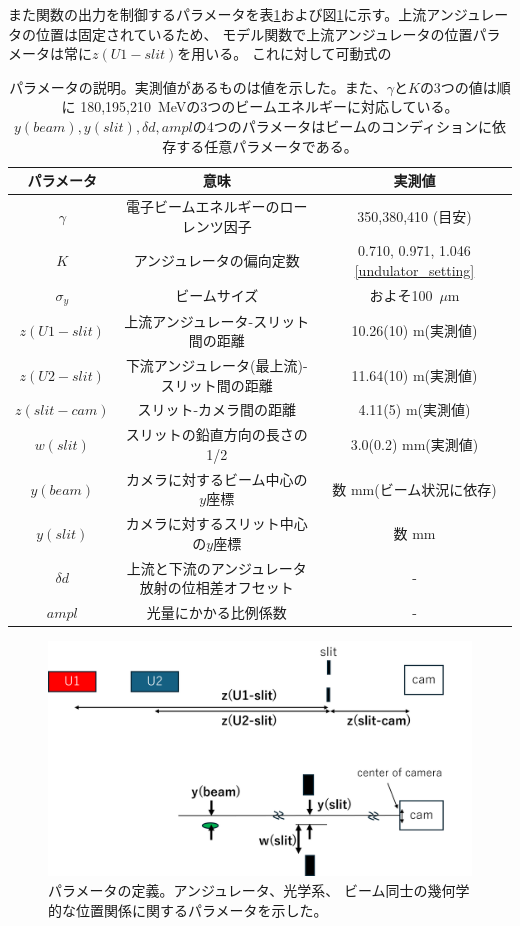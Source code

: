\documentclass[a4paper,11pt,uplatex]{jsbook}
\begin{document}
また関数の出力を制御するパラメータを表\ref{tab:prm}および図\ref{prm}に示す。上流アンジュレータの位置は固定されているため、
モデル関数で上流アンジュレータの位置パラメータは常に$z(U1-slit)$を用いる。
これに対して可動式の
\begin{table}[h]
  \centering
  \begin{tabular}{c|c|c}
    パラメータ & 意味 & 実測値\\ \hline 
    $\gamma$ & 電子ビームエネルギーのローレンツ因子 & 350,380,410 (目安)\\
    $K$ & アンジュレータの偏向定数 & 0.710, 0.971, 1.046 \ref{undulator_setting}\\
    $\sigma_y$ & ビームサイズ & およそ100~$\mu$m \\
    $z(U1-slit)$ & 上流アンジュレータ-スリット間の距離 & 10.26(10) m(実測値)\\
    $z(U2-slit)$ & 下流アンジュレータ(最上流)-スリット間の距離 & 11.64(10) m(実測値)\\
    $z(slit-cam)$ & スリット-カメラ間の距離 & 4.11(5) m(実測値)\\
    $w(slit)$ & スリットの鉛直方向の長さの1/2 & 3.0(0.2) mm(実測値)\\
    $y(beam)$ & カメラに対するビーム中心の$y$座標 & 数 mm(ビーム状況に依存)\\
    $y(slit)$ & カメラに対するスリット中心の$y$座標 & 数 mm\\
    $\delta d$ & 上流と下流のアンジュレータ放射の位相差オフセット &  -\\
    $ampl$ & 光量にかかる比例係数 & - 
  \end{tabular}
  \caption[パラメータの説明]{パラメータの説明。実測値があるものは値を示した。また、$\gamma$と$K$の3つの値は順に
  180,195,210~MeVの3つのビームエネルギーに対応している。$y(beam),y(slit),\delta d, ampl$の4つのパラメータはビームのコンディションに依存する任意パラメータである。}\label{tab:prm}
\end{table}
  
\begin{figure}[H]
  \centering
  \includegraphics[width=0.8\linewidth]{image/4-prm.png}
  \caption[パラメータの定義]{パラメータの定義。アンジュレータ、光学系、
  ビーム同士の幾何学的な位置関係に関するパラメータを示した。}\label{prm}
\end{figure}
\end{document}
